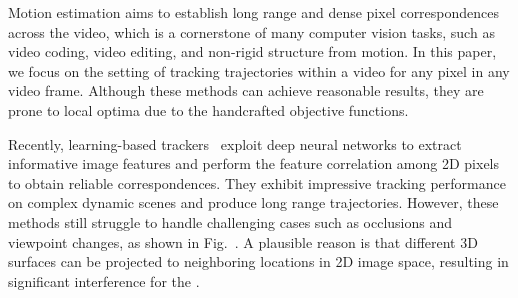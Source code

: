 \iffalse
{}

Motion estimation aims to establish long range and dense pixel correspondences across the video, which is a cornerstone of many computer vision tasks, such as video coding, video editing, and non-rigid structure from motion.
In this paper, we focus on the setting of tracking trajectories within a video for any pixel in any video frame.
Although these methods can achieve reasonable results, they are prone to local optima due to the handcrafted objective functions.

Recently, learning-based trackers~\cite{pips, zheng2023pointodyssey, Tapir, cotracker} exploit deep neural networks to extract informative image features and perform the feature correlation among 2D pixels to obtain reliable correspondences.
They exhibit impressive tracking performance on complex dynamic scenes and produce long range trajectories.
However, these methods still struggle to handle challenging cases such as occlusions and viewpoint changes, as shown in Fig.~\tocite{}.
A plausible reason is that different 3D surfaces can be projected to neighboring locations in 2D image space, resulting in significant interference for the .

